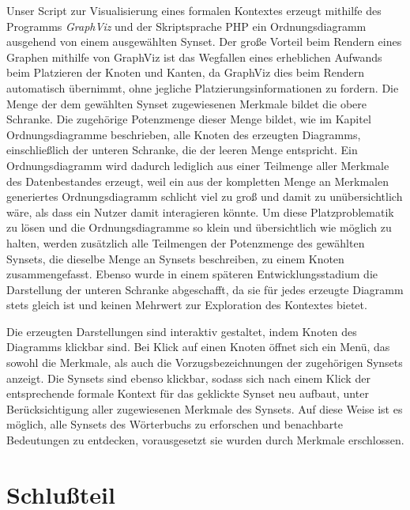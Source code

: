 \documentclass[pagesize,paper=A4,DIV=calc,fontsize=12pt,draft=false]{scrreprt}
\begin{document}
Unser Script zur Visualisierung eines formalen Kontextes erzeugt mithilfe des Programms \emph{GraphViz} und der Skriptsprache PHP ein Ordnungsdiagramm ausgehend von einem ausgewählten Synset. 
Der große Vorteil beim Rendern eines Graphen mithilfe von GraphViz ist das Wegfallen eines erheblichen Aufwands beim Platzieren der Knoten und Kanten, da GraphViz dies beim Rendern automatisch übernimmt, ohne jegliche Platzierungsinformationen zu fordern. 
Die Menge der dem gewählten Synset zugewiesenen Merkmale bildet die obere Schranke. 
Die zugehörige Potenzmenge dieser Menge bildet, wie im Kapitel Ordnungsdiagramme beschrieben, alle Knoten des erzeugten Diagramms, einschließlich der unteren Schranke, die der leeren Menge entspricht. 
Ein Ordnungsdiagramm wird dadurch lediglich aus einer Teilmenge aller Merkmale des Datenbestandes erzeugt, weil ein aus der kompletten Menge an Merkmalen generiertes Ordnungsdiagramm schlicht viel zu groß und damit zu unübersichtlich wäre, als dass ein Nutzer damit interagieren könnte. 
Um diese Platzproblematik zu lösen und die Ordnungsdiagramme so klein und übersichtlich wie möglich zu halten, werden zusätzlich alle Teilmengen der Potenzmenge des gewählten Synsets, die dieselbe Menge an Synsets beschreiben, zu einem Knoten zusammengefasst. 
Ebenso wurde in einem späteren Entwicklungsstadium die Darstellung der unteren Schranke abgeschafft, da sie für jedes erzeugte Diagramm stets gleich ist und keinen Mehrwert zur Exploration des Kontextes bietet.

Die erzeugten Darstellungen sind interaktiv gestaltet, indem Knoten des Diagramms klickbar sind. 
Bei Klick auf einen Knoten öffnet sich ein Menü, das sowohl die Merkmale, als auch die Vorzugsbezeichnungen der zugehörigen Synsets anzeigt. 
Die Synsets sind ebenso klickbar, sodass sich nach einem Klick der entsprechende formale Kontext für das geklickte Synset neu aufbaut, unter Berücksichtigung aller zugewiesenen Merkmale des Synsets. 
Auf diese Weise ist es möglich, alle Synsets des Wörterbuchs zu erforschen und benachbarte Bedeutungen zu entdecken, vorausgesetzt sie wurden durch Merkmale erschlossen. 

\chapter{Schlußteil}
\end{document}
